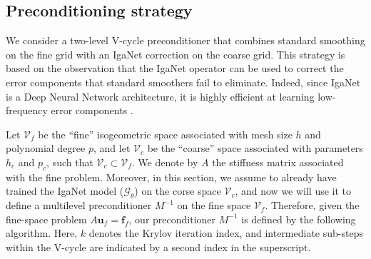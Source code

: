 \documentclass{article}
\newcommand{\mm}[1]{\todo[color=orange!20]{\textbf{MM:} #1}}
\theoremstyle{plain}
\numberwithin{equation}{section}
\begin{document}
\subsection{Preconditioning strategy}\label{sec:preconditioning_strategy}
We consider a two-level V-cycle preconditioner that combines standard smoothing on the fine grid with an IgaNet correction on the coarse grid. This strategy is based on the observation that the IgaNet operator can be used to correct the error components that standard smoothers fail to eliminate.
Indeed, since IgaNet is a Deep Neural Network architecture, it is highly efficient at learning low-frequency error components \cite{math10214014}.

Let $\mathcal{V}_{f}$ be the ``fine'' isogeometric space associated with mesh size $h$ and polynomial degree $p$, and let $\mathcal{V}_{c}$ be the ``coarse'' space associated with parameters $h_{c}$ and $p_{c}$, such that $\mathcal{V}_{c} \subset \mathcal{V}_f$.
We denote by $A$ the stiffness matrix associated with the fine problem.
Moreover, in this section, we assume to already have trained the IgaNet model ($\mathcal{G}_{\theta}$) on the corse space $\mathcal{V}_c$, and now we will use it to define a multilevel preconditioner $M^{-1}$ on the fine space $\mathcal{V}_f$. Therefore, given the fine-space problem  %
$A \mathbf{u}_f = \mathbf{f}_f$, our preconditioner $M^{-1}$ is defined by the following algorithm. Here, $k$ denotes the Krylov iteration index, and intermediate sub-steps within the V-cycle are indicated by a second index in the superscript.
\end{document}
